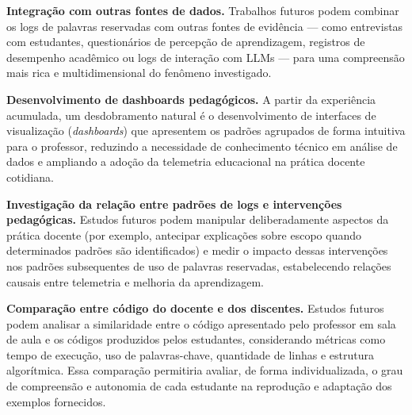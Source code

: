 \textbf{Integração com outras fontes de dados.} Trabalhos futuros podem combinar os logs de palavras reservadas com outras fontes de evidência — como entrevistas com estudantes, questionários de percepção de aprendizagem, registros de desempenho acadêmico ou logs de interação com LLMs — para uma compreensão mais rica e multidimensional do fenômeno investigado.

\textbf{Desenvolvimento de dashboards pedagógicos.} A partir da experiência acumulada, um desdobramento natural é o desenvolvimento de interfaces de visualização (\textit{dashboards}) que apresentem os padrões agrupados de forma intuitiva para o professor, reduzindo a necessidade de conhecimento técnico em análise de dados e ampliando a adoção da telemetria educacional na prática docente cotidiana.

\textbf{Investigação da relação entre padrões de logs e intervenções pedagógicas.} Estudos futuros podem manipular deliberadamente aspectos da prática docente (por exemplo, antecipar explicações sobre escopo quando determinados padrões são identificados) e medir o impacto dessas intervenções nos padrões subsequentes de uso de palavras reservadas, estabelecendo relações causais entre telemetria e melhoria da aprendizagem.

\textbf{Comparação entre código do docente e dos discentes.} Estudos futuros podem analisar a similaridade entre o código apresentado pelo professor em sala de aula e os códigos produzidos pelos estudantes, considerando métricas como tempo de execução, uso de palavras-chave, quantidade de linhas e estrutura algorítmica. Essa comparação permitiria avaliar, de forma individualizada, o grau de compreensão e autonomia de cada estudante na reprodução e adaptação dos exemplos fornecidos.